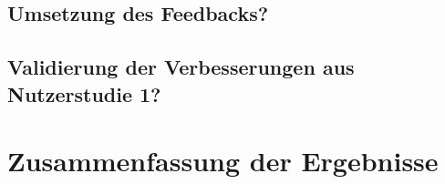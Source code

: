 \lipsum[5]

\subsection{Umsetzung des Feedbacks?}\label{sec:UmsetzungFeedbackNutzerstudie2}

\lipsum[5]

\subsection{Validierung der Verbesserungen aus Nutzerstudie 1?}\label{sec:ValidierungNutzerstudie2}

\lipsum[5]

\section{Zusammenfassung der Ergebnisse}\label{sec:ZusammenfassungNutzerstudien}

\lipsum[5]

